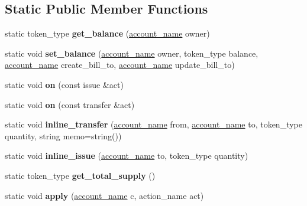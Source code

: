 \subsection*{Static Public Member Functions}
\begin{DoxyCompactItemize}
\item 
\mbox{\label{classaacio_1_1generic__currency_ac440398a7c62bed590dddb600860efdd}} 
static token\+\_\+type {\bfseries get\+\_\+balance} (\mbox{\hyperlink{structaacio_1_1chain_1_1name}{account\+\_\+name}} owner)
\item 
\mbox{\label{classaacio_1_1generic__currency_aacebc3d97827f5c12bc3ebf120e21014}} 
static void {\bfseries set\+\_\+balance} (\mbox{\hyperlink{structaacio_1_1chain_1_1name}{account\+\_\+name}} owner, token\+\_\+type balance, \mbox{\hyperlink{structaacio_1_1chain_1_1name}{account\+\_\+name}} create\+\_\+bill\+\_\+to, \mbox{\hyperlink{structaacio_1_1chain_1_1name}{account\+\_\+name}} update\+\_\+bill\+\_\+to)
\item 
\mbox{\label{classaacio_1_1generic__currency_a198e5214b97db6343a033e251ddb8523}} 
static void {\bfseries on} (const issue \&act)
\item 
\mbox{\label{classaacio_1_1generic__currency_a5e3a59c14081bd666ba4112d71606a6d}} 
static void {\bfseries on} (const transfer \&act)
\item 
\mbox{\label{classaacio_1_1generic__currency_a4f301131d33342342d364d78c9f6079e}} 
static void {\bfseries inline\+\_\+transfer} (\mbox{\hyperlink{structaacio_1_1chain_1_1name}{account\+\_\+name}} from, \mbox{\hyperlink{structaacio_1_1chain_1_1name}{account\+\_\+name}} to, token\+\_\+type quantity, string memo=string())
\item 
\mbox{\label{classaacio_1_1generic__currency_ab06dc76d83c3d8213b6c434f90ef5a9a}} 
static void {\bfseries inline\+\_\+issue} (\mbox{\hyperlink{structaacio_1_1chain_1_1name}{account\+\_\+name}} to, token\+\_\+type quantity)
\item 
\mbox{\label{classaacio_1_1generic__currency_a5fba4f7b0575da81f2a006183f349ca0}} 
static token\+\_\+type {\bfseries get\+\_\+total\+\_\+supply} ()
\item 
\mbox{\label{classaacio_1_1generic__currency_a5b51c7ffba32dd5be8a3f0ebdf190ac3}} 
static void {\bfseries apply} (\mbox{\hyperlink{structaacio_1_1chain_1_1name}{account\+\_\+name}} c, action\+\_\+name act)
\end{DoxyCompactItemize}
